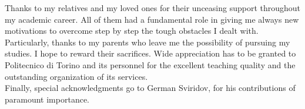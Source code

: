 \ringraziamenti

Thanks to my relatives and my loved ones for their unceasing support throughout my academic career. All of them had a fundamental role in giving me always new motivations to overcome step by step the tough obstacles I dealt with. Particularly, thanks to my parents who leave me the possibility of pursuing my studies. I hope to reward their sacrifices.
Wide appreciation has to be granted to Politecnico di Torino and its personnel for the excellent teaching quality and the outstanding organization of its services. \\ 
Finally, special acknowledgments go to German Sviridov, for his contributions of paramount importance. 